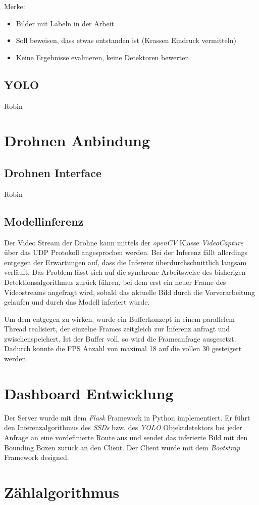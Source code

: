 Merke:

\begin{itemize}
	\item Bilder mit Labeln in der Arbeit
	\item Soll beweisen, dass etwas entstanden ist (Krassen Eindruck vermitteln)
	\item Keine Ergebnisse evaluieren, keine Detektoren bewerten
\end{itemize}

\subsection*{YOLO}

Robin

\section{Drohnen Anbindung}

\subsection*{Drohnen Interface}

Robin

\subsection*{Modellinferenz}

Der Video Stream der Drohne kann mittels der \textit{openCV} Klasse \textit{VideoCapture} über das UDP Protokoll angesprochen werden. Bei der Inferenz fällt allerdings entgegen der Erwartungen auf, dass die Inferenz überdurchschnittlich langsam verläuft. Das Problem lässt sich auf die synchrone Arbeitsweise des bisherigen Detektionsalgorithmus zurück führen, bei dem erst ein neuer Frame des Videostreams angefragt wird, sobald das aktuelle Bild durch die Vorverarbeitung gelaufen und durch das Modell inferiert wurde. 

Um dem entgegen zu wirken, wurde ein Bufferkonzept in einem parallelem Thread realisiert, der einzelne Frames zeitgleich zur Inferenz anfragt und zwischenspeichert. Ist der Buffer voll, so wird die Frameanfrage ausgesetzt. Dadurch konnte die FPS Anzahl von maximal 18 auf die vollen 30 gesteigert werden. 

\section{Dashboard Entwicklung}

Der Server wurde mit dem \textit{Flask} Framework in Python implementiert. Er führt den Inferenzalgorithmus des \textit{SSDs} bzw. des \textit{YOLO} Objektdetektors bei jeder Anfrage an eine vordefinierte Route aus und sendet das inferierte Bild mit den Bounding Boxen zurück an den Client. Der Client wurde mit dem \textit{Bootstrap} Framework designed. 

\section{Zählalgorithmus}


